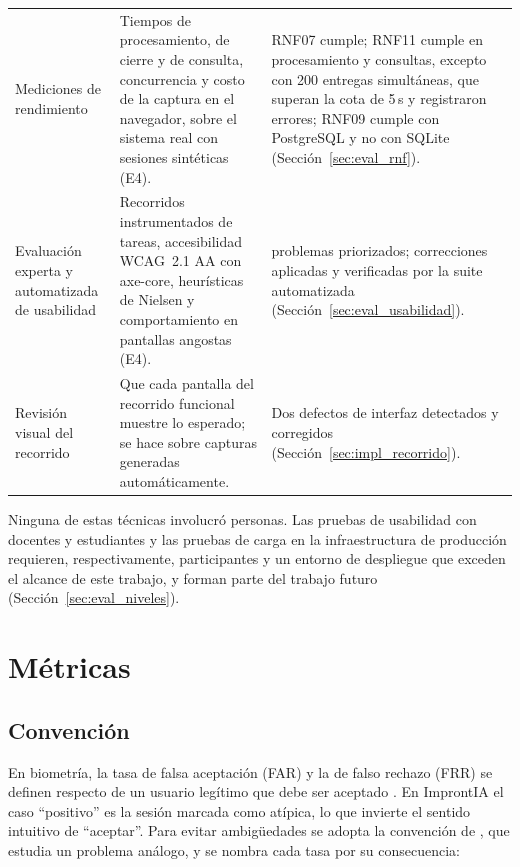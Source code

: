 \begin{table}[h!]
\begin{tabularx}{\textwidth}{>{\raggedright\arraybackslash}p{3.3cm} >{\raggedright\arraybackslash}X >{\raggedright\arraybackslash}p{3.5cm}}
        Mediciones de rendimiento & Tiempos de procesamiento, de cierre y de consulta, concurrencia y costo de la captura en el navegador, sobre el sistema real con sesiones sintéticas (E4). & RNF07 cumple; RNF11 cumple en procesamiento y consultas, excepto con 200 entregas simultáneas, que superan la cota de 5\,s y registraron errores; RNF09 cumple con PostgreSQL y no con SQLite (Sección~\ref{sec:eval_rnf}). \\
        Evaluación experta y automatizada de usabilidad & Recorridos instrumentados de tareas, accesibilidad WCAG~2.1 AA con axe-core, heurísticas de Nielsen y comportamiento en pantallas angostas (E4). & 14 problemas priorizados; correcciones aplicadas y verificadas por la suite automatizada (Sección~\ref{sec:eval_usabilidad}). \\
        Revisión visual del recorrido & Que cada pantalla del recorrido funcional muestre lo esperado; se hace sobre capturas generadas automáticamente. & Dos defectos de interfaz detectados y corregidos (Sección~\ref{sec:impl_recorrido}). \\
        \bottomrule
    \end{tabularx}
\end{table}

Ninguna de estas técnicas involucró personas. Las pruebas de usabilidad con docentes y estudiantes y las pruebas de carga en la infraestructura de producción requieren, respectivamente, participantes y un entorno de despliegue que exceden el alcance de este trabajo, y forman parte del trabajo futuro (Sección~\ref{sec:eval_niveles}).

\section{Métricas}
\label{sec:eval_metricas}

\subsection{Convención}

En biometría, la tasa de falsa aceptación (FAR) y la de falso rechazo (FRR) se definen respecto de un usuario legítimo que debe ser aceptado \parencite{Jain2004, Teh2013}. En ImprontIA el caso ``positivo'' es la sesión marcada como atípica, lo que invierte el sentido intuitivo de ``aceptar''. Para evitar ambigüedades se adopta la convención de \textcite{Mehta2025}, que estudia un problema análogo, y se nombra cada tasa por su consecuencia:

